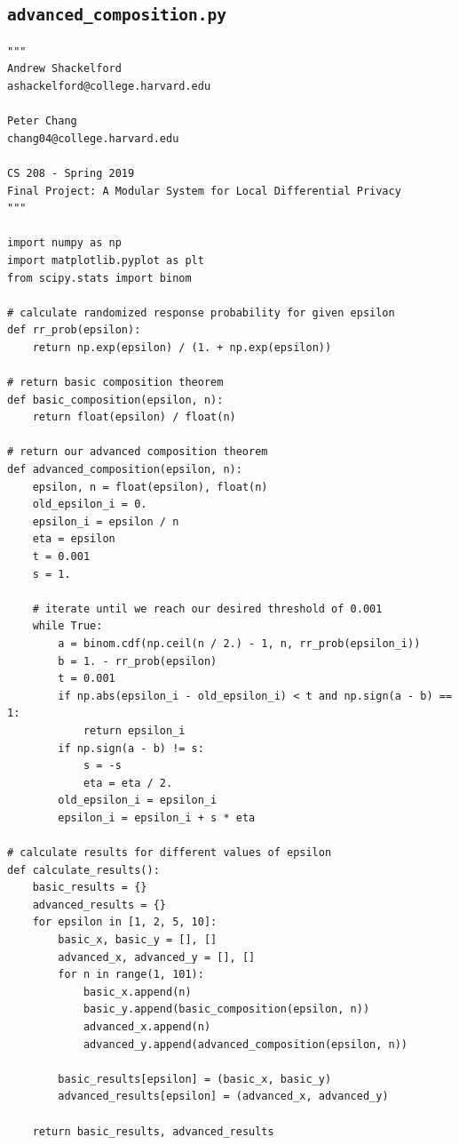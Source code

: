 \documentclass[12pt]{article}
\theoremstyle{definition}
\def\cl{\lstinline}
\begin{document}
\newpage

\begin{appendices}

\section{\cl{advanced_composition.py}}
\label{appendix:advanced_composition}
\begin{lstlisting}
"""
Andrew Shackelford
ashackelford@college.harvard.edu

Peter Chang
chang04@college.harvard.edu

CS 208 - Spring 2019
Final Project: A Modular System for Local Differential Privacy
"""

import numpy as np
import matplotlib.pyplot as plt
from scipy.stats import binom

# calculate randomized response probability for given epsilon
def rr_prob(epsilon):
    return np.exp(epsilon) / (1. + np.exp(epsilon))

# return basic composition theorem
def basic_composition(epsilon, n):
    return float(epsilon) / float(n)

# return our advanced composition theorem
def advanced_composition(epsilon, n):
    epsilon, n = float(epsilon), float(n)
    old_epsilon_i = 0.
    epsilon_i = epsilon / n
    eta = epsilon
    t = 0.001
    s = 1.

    # iterate until we reach our desired threshold of 0.001
    while True:
        a = binom.cdf(np.ceil(n / 2.) - 1, n, rr_prob(epsilon_i))
        b = 1. - rr_prob(epsilon)
        t = 0.001
        if np.abs(epsilon_i - old_epsilon_i) < t and np.sign(a - b) == 1:
            return epsilon_i
        if np.sign(a - b) != s:
            s = -s
            eta = eta / 2.
        old_epsilon_i = epsilon_i
        epsilon_i = epsilon_i + s * eta

# calculate results for different values of epsilon
def calculate_results():
    basic_results = {}
    advanced_results = {}
    for epsilon in [1, 2, 5, 10]:
        basic_x, basic_y = [], []
        advanced_x, advanced_y = [], []
        for n in range(1, 101):
            basic_x.append(n)
            basic_y.append(basic_composition(epsilon, n))
            advanced_x.append(n)
            advanced_y.append(advanced_composition(epsilon, n))

        basic_results[epsilon] = (basic_x, basic_y)
        advanced_results[epsilon] = (advanced_x, advanced_y)

    return basic_results, advanced_results


\end{lstlisting}
\end{appendices}
\end{document}

